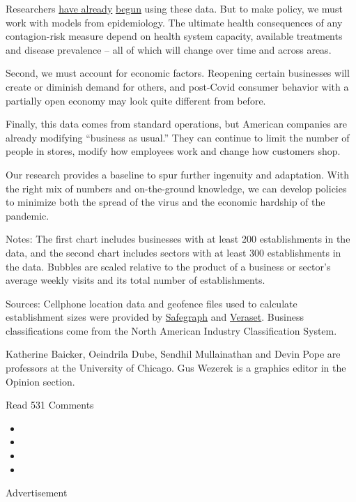 Researchers \href{https://www.nber.org/papers/w27042}{have already}
\href{http://ide.mit.edu/sites/default/files/publications/Full\%20paper\%204-26.pdf}{begun}
using these data. But to make policy, we must work with models from
epidemiology. The ultimate health consequences of any contagion-risk
measure depend on health system capacity, available treatments and
disease prevalence -- all of which will change over time and across
areas.

Second, we must account for economic factors. Reopening certain
businesses will create or diminish demand for others, and post-Covid
consumer behavior with a partially open economy may look quite different
from before.

Finally, this data comes from standard operations, but American
companies are already modifying ``business as usual.'' They can continue
to limit the number of people in stores, modify how employees work and
change how customers shop.

Our research provides a baseline to spur further ingenuity and
adaptation. With the right mix of numbers and on-the-ground knowledge,
we can develop policies to minimize both the spread of the virus and the
economic hardship of the pandemic.

Notes: The first chart includes businesses with at least 200
establishments in the data, and the second chart includes sectors with
at least 300 establishments in the data. Bubbles are scaled relative to
the product of a business or sector's average weekly visits and its
total number of establishments.

Sources: Cellphone location data and geofence files used to calculate
establishment sizes were provided by
\href{https://www.safegraph.com/}{Safegraph} and
\href{https://www.veraset.com/}{Veraset}. Business classifications come
from the North American Industry Classification System.

Katherine Baicker, Oeindrila Dube, Sendhil Mullainathan and Devin Pope
are professors at the University of Chicago. Gus Wezerek is a graphics
editor in the Opinion section.

Read 531 Comments

\begin{itemize}
\item
\item
\item
\item
\end{itemize}

Advertisement

